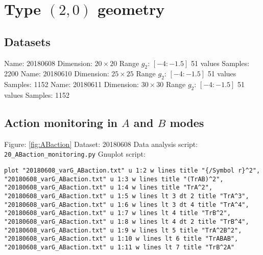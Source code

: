 \documentclass[12pt,a4paper]{article}
\begin{document}
\section{Type $(2,0)$ geometry}

\subsection{Datasets}
Name: 20180608\newline
Dimension: $20 \times 20$\newline
Range $g_2$: $[-4:-1.5]$ 51 values\newline
Samples: 2200\newline
\newline
Name: 20180610\newline
Dimension: $25 \times 25$\newline
Range $g_2$: $[-4:-1.5]$ 51 values\newline
Samples: 1152\newline
\newline
Name: 20180611\newline
Dimension: $30 \times 30$\newline
Range $g_2$: $[-4:-1.5]$ 51 values\newline
Samples: 1152\newline

\subsection{Action monitoring in $A$ and $B$ modes}
Figure: \ref{fig:ABaction} \newline
Dataset: 20180608\newline
Data analysis script: \verb|20_ABaction_monitoring.py|\newline
Gnuplot script:
\begin{lstlisting}
plot "20180608_varG_ABaction.txt" u 1:2 w lines title "{/Symbol r}^2", "20180608_varG_ABaction.txt" u 1:3 w lines title "(TrAB)^2", "20180608_varG_ABaction.txt" u 1:4 w lines title "TrA^2", "20180608_varG_ABaction.txt" u 1:5 w lines lt 3 dt 2 title "TrA^3", "20180608_varG_ABaction.txt" u 1:6 w lines lt 3 dt 4 title "TrA^4", "20180608_varG_ABaction.txt" u 1:7 w lines lt 4 title "TrB^2", "20180608_varG_ABaction.txt" u 1:8 w lines lt 4 dt 2 title "TrB^4", "20180608_varG_ABaction.txt" u 1:9 w lines lt 5 title "TrA^2B^2", "20180608_varG_ABaction.txt" u 1:10 w lines lt 6 title "TrABAB", "20180608_varG_ABaction.txt" u 1:11 w lines lt 7 title "TrB^2A"
\end{lstlisting}
\end{document}
